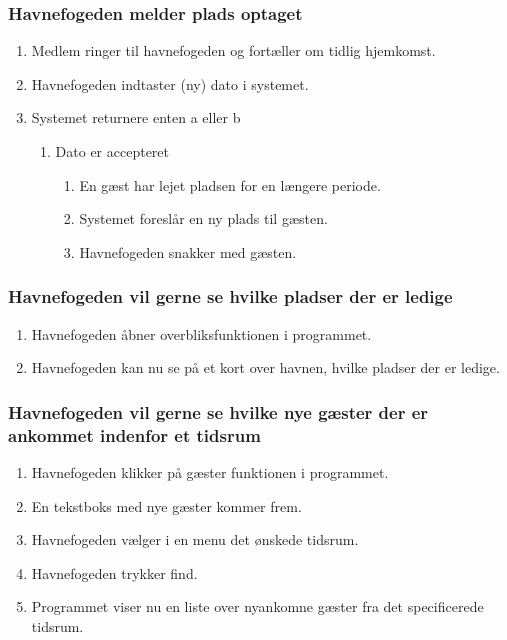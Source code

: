     \subsubsection{Havnefogeden melder plads optaget}

    \begin{enumerate}
      \item Medlem ringer til havnefogeden og fortæller om tidlig hjemkomst.
      \item Havnefogeden indtaster (ny) dato i systemet.
      \item Systemet returnere enten a eller b
      \begin{enumerate}
        \item Dato er accepteret
        \begin{enumerate}
          \item En gæst har lejet pladsen for en længere periode.
          \item Systemet foreslår en ny plads til gæsten.
          \item Havnefogeden snakker med gæsten.
        \end{enumerate}
      \end{enumerate}  
    \end{enumerate}


\subsubsection{Havnefogeden vil gerne se hvilke pladser der er ledige}
    \begin{enumerate}
      \item Havnefogeden åbner overbliksfunktionen i programmet.
      \item Havnefogeden kan nu se på et kort over havnen, hvilke pladser der er ledige.
    \end{enumerate}

    \subsubsection{Havnefogeden vil gerne se hvilke nye gæster der er ankommet indenfor et tidsrum}
    \begin{enumerate}
      \item Havnefogeden klikker på gæster funktionen i programmet.
      \item En tekstboks med nye gæster kommer frem.
      \item Havnefogeden vælger i en menu det ønskede tidsrum.
      \item Havnefogeden trykker find.
      \item Programmet viser nu en liste over nyankomne gæster fra det specificerede tidsrum.
    \end{enumerate}

